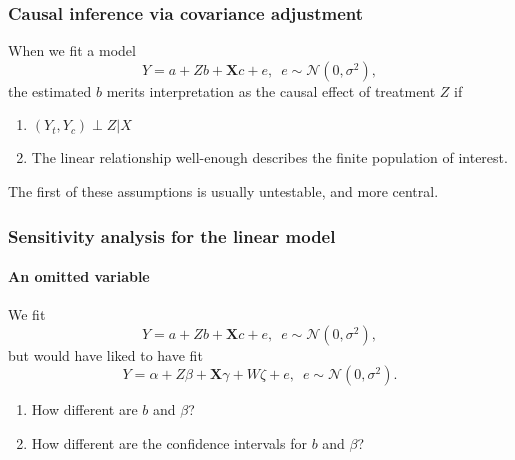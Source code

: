 \begin{frame}
  \frametitle{Causal inference via covariance adjustment}


When we fit a model
$$
Y = a + Zb +  \mathbf{X} c + e,\,\,\, e \sim \mathcal{N}(0, \sigma^{2}),
$$
the estimated $b$ merits interpretation as the causal effect of treatment $Z$ if\\
\begin{enumerate}
\item $(Y_{t}, Y_{c}) \perp Z | X$
\item The linear relationship well-enough describes the finite population of interest.
\end{enumerate}

The first of these assumptions is usually untestable, and more central. 

\end{frame}

\begin{frame}
  \frametitle{Sensitivity analysis for the linear model}
\framesubtitle{An omitted variable}

We fit
$$
Y = a + Zb +  \mathbf{X} c + e,\,\,\, e \sim \mathcal{N}(0, \sigma^{2}),
$$
but would have liked to have fit
$$
Y = \alpha + Z\beta +  \mathbf{X} \gamma + W\zeta + e,\,\,\, e \sim \mathcal{N}(0, \sigma^{2}).
$$

\begin{enumerate}
\item<2-> How different are $b$ and $\beta$?
\item<3-> How different are the confidence intervals for $b$ and $\beta$?
\end{enumerate}

\end{frame}

